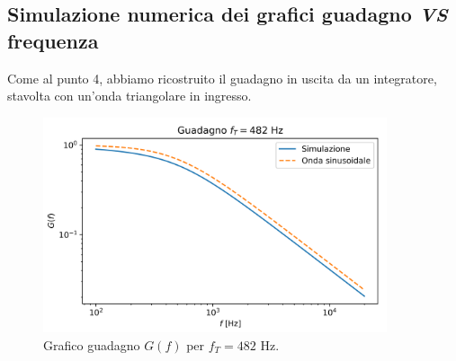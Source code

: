 \documentclass{article}[a4paper, oneside,11pt]
\begin{document}
    \subsection{Simulazione numerica dei grafici guadagno \textit{VS} frequenza}
        Come al punto 4, abbiamo ricostruito il guadagno in uscita da un integratore, stavolta con un'onda triangolare in ingresso.
            \begin{figure}[H]
                \centering
                \includegraphics[width=0.9\textwidth]{img/Guadagno-T.png}
                \caption{Grafico guadagno $G(f)$ per $f_T=482$ Hz.}
            \end{figure}
\end{document}
